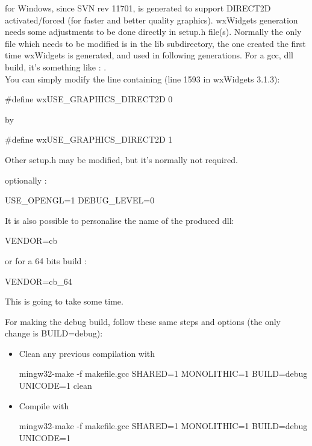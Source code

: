 \codeblocks for Windows, since SVN rev 11701, is generated to support DIRECT2D activated/forced (for faster and better quality graphics). wxWidgets generation needs some adjustments to be done directly in setup.h file(s). Normally the only file which needs to be modified is in the lib subdirectory, the one created the first time wxWidgets is generated, and used in following generations. For a gcc, dll build, it's something like : .\\
You can simply modify the line containing (line 1593 in wxWidgets 3.1.3):
\begin{code}
    #define wxUSE_GRAPHICS_DIRECT2D 0 
\end{code}
by
\begin{code}
    #define wxUSE_GRAPHICS_DIRECT2D 1  
\end{code}
Other setup.h may be modified, but it's normally not required.

optionally :
\begin{cmd}
USE_OPENGL=1
DEBUG_LEVEL=0
\end{cmd}


It is also possible to personalise the name of the produced dll:
\begin{cmd}
VENDOR=cb
\end{cmd}
or for a 64 bits build :
\begin{cmd}
VENDOR=cb_64
\end{cmd}


This is going to take some time.

For making the debug build, follow these same steps and options (the only change is BUILD=debug):

\begin{itemize}
\item Clean any previous compilation with
	\begin{cmd}
	mingw32-make -f makefile.gcc SHARED=1 MONOLITHIC=1 BUILD=debug UNICODE=1 clean
	\end{cmd}
\item Compile with
	\begin{cmd}
	mingw32-make -f makefile.gcc SHARED=1 MONOLITHIC=1 BUILD=debug UNICODE=1
	\end{cmd}
\end{itemize}

